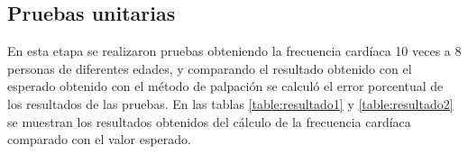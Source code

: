 \subsection{Pruebas unitarias}
En esta etapa se realizaron pruebas obteniendo la frecuencia cardíaca 10 veces a 8 personas de diferentes edades, y comparando el resultado obtenido con el esperado obtenido con el método de palpación se calculó el error porcentual de los resultados de las pruebas. En las tablas \ref{table:resultado1} y \ref{table:resultado2} se muestran los resultados obtenidos del cálculo de la frecuencia cardíaca comparado con el valor esperado. \\

\begin{table}[htbp]
	\centering
	\qquad


\end{table}
